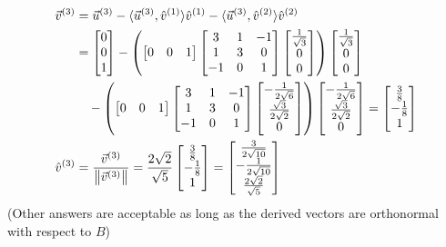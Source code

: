 \begin{Answer}
\begin{align*}
\vec{v}^{(3)} &= \vec{u}^{(3)} - \langle \vec{u}^{(3)}, \hat{v}^{(1)}\rangle\hat{v}^{(1)} - \langle \vec{u}^{(3)}, \hat{v}^{(2)}\rangle\hat{v}^{(2)} \\
&= \begin{bmatrix}
0 \\
0 \\
1
\end{bmatrix}
-
\left(\begin{bmatrix}
0 & 0 & 1
\end{bmatrix}
\begin{bmatrix}
3 & 1 & -1 \\ 
1 & 3 & 0 \\ 
-1 & 0 & 1
\end{bmatrix}
\begin{bmatrix}
\frac{1}{\sqrt{3}} \\
0 \\
0
\end{bmatrix}\right)
\begin{bmatrix}
\frac{1}{\sqrt{3}} \\
0 \\
0
\end{bmatrix} \\
& \quad -
\left(\begin{bmatrix}
0 & 0 & 1
\end{bmatrix}
\begin{bmatrix}
3 & 1 & -1 \\ 
1 & 3 & 0 \\ 
-1 & 0 & 1
\end{bmatrix}
\begin{bmatrix}
-\frac{1}{2\sqrt{6}}\\ 
\frac{\sqrt{3}}{2\sqrt{2}}\\ 
0
\end{bmatrix}\right)
\begin{bmatrix}
-\frac{1}{2\sqrt{6}}\\ 
\frac{\sqrt{3}}{2\sqrt{2}}\\ 
0
\end{bmatrix}
=
\begin{bmatrix}
\frac{3}{8}\\
-\frac{1}{8}\\ 
1
\end{bmatrix} \\
\hat{v}^{(3)} &= \frac{\vec{v}^{(3)}}{\norm{\vec{v}^{(3)}}} = 
\frac{2\sqrt{2}}{\sqrt{5}} \begin{bmatrix}
\frac{3}{8}\\
-\frac{1}{8}\\ 
1
\end{bmatrix}
=
\begin{bmatrix}
\frac{3}{2\sqrt{10}}\\ 
-\frac{1}{2\sqrt{10}}\\ 
\frac{2\sqrt{2}}{\sqrt{5}}
\end{bmatrix}
\end{align*}
(Other answers are acceptable as long as the derived vectors are orthonormal with respect to $B$)
\end{Answer}


